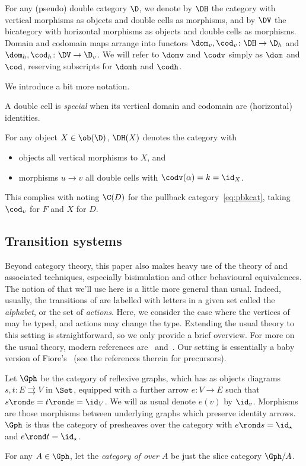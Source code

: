 \documentclass{LMCS}
\theoremstyle{plain}\newtheorem{satz}[thm]{Satz}
\begin{document}
For any (pseudo) double category $\D$, we denote by $\DH$ the category
with vertical morphisms as objects and double cells as morphisms, and
by $\DV$ the bicategory with horizontal morphisms as objects and
double cells as morphisms.  Domain and codomain maps arrange into
functors $\dom_v,\cod_v \colon \DH \to \D_h$ and $\dom_h,\cod_h \colon
\DV \to \D_v$. We will refer to $\domv$ and $\codv$ simply as $\dom$
and $\cod$, reserving subscripts for $\domh$ and $\codh$.

We introduce a bit more notation.
\begin{defi}
  A double cell 
is \emph{special} when its vertical domain and codomain are (horizontal) identities.
\end{defi}
For any object $X \in \ob (\D)$, $\DH (X)$ denotes the category with
\begin{itemize}
\item objects all vertical morphisms to $X$, and
\item morphisms $u \to v$ all double cells 
   with $\codv (\alpha) = k = \id_X$.
\end{itemize}
This complies with noting $\C(D)$ for the pullback category~\eqref{eq:pbkcat}, taking 
$\cod_v$ for $F$ and $X$ for $D$.

\subsection{Transition systems}\label{subsec:prelim:lts}
Beyond category theory, this paper also makes heavy use of the theory
of \ltss{} and associated techniques, especially bisimulation and
other behavioural equivalences.  The notion of \lts{} that we'll use
here is a little more general than usual. Indeed, usually, the
transitions of \anlts{} are labelled with letters in a given set
called the \emph{alphabet}, or the set of \emph{actions}. Here, we
consider the case where the vertices of \anlts{} may be typed, and
actions may change the type.  Extending the usual theory to this
setting is straightforward, so we only provide a brief overview. For
more on the usual theory, modern references are~\citet{Sangio}
and~\citet{SangioRutten}. Our setting is essentially a baby version of
Fiore's~\cite{DBLP:conf/ifipTCS/Fiore00} (see the references therein
for precursors).

Let $\Gph$ be the category of reflexive graphs, which has as objects
diagrams $s,t \colon E \rightrightarrows V$ in $\Set$, equipped with a
further arrow $e \colon V \to E$ such that $s \rond e = t \rond e =
\id_V$. We will as usual denote $e(v)$ by $\id_v$. Morphisms are those
morphisms between underlying graphs which preserve identity arrows.
$\Gph$ is thus the category of presheaves over the category  with $e \rond s = \id_\star$ and $e \rond t = \id_\star$.
\begin{defi}
  For any $A \in \Gph$, let the \emph{category of \ltss{} over $A$} be
  just the slice category $\Gph / A$.
\end{defi}
\end{document}
